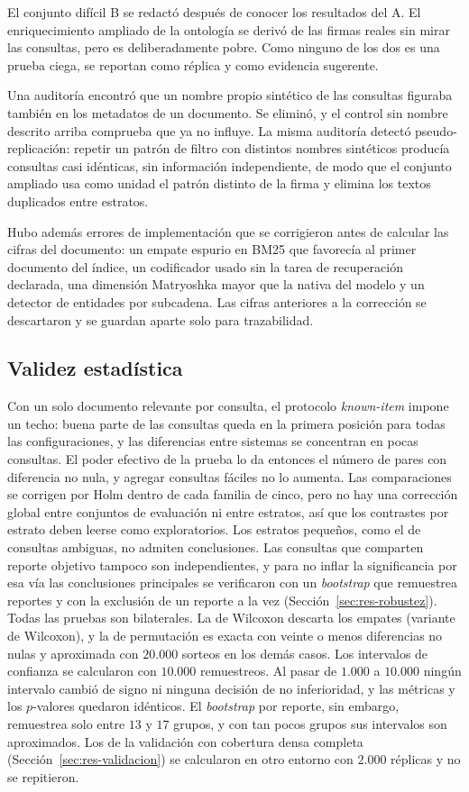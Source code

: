 \documentclass[11pt,letterpaper]{article}
\numberwithin{equation}{section}
\begin{document}
El conjunto difícil B se redactó después de conocer los resultados del A. El enriquecimiento ampliado de la ontología se derivó de las firmas reales sin mirar las consultas, pero es deliberadamente pobre. Como ninguno de los dos es una prueba ciega, se reportan como réplica y como evidencia sugerente.

Una auditoría encontró que un nombre propio sintético de las consultas figuraba también en los metadatos de un documento. Se eliminó, y el control sin nombre descrito arriba comprueba que ya no influye. La misma auditoría detectó pseudo-replicación: repetir un patrón de filtro con distintos nombres sintéticos producía consultas casi idénticas, sin información independiente, de modo que el conjunto ampliado usa como unidad el patrón distinto de la firma y elimina los textos duplicados entre estratos.

Hubo además errores de implementación que se corrigieron antes de calcular las cifras del documento: un empate espurio en BM25 que favorecía al primer documento del índice, un codificador usado sin la tarea de recuperación declarada, una dimensión Matryoshka mayor que la nativa del modelo y un detector de entidades por subcadena. Las cifras anteriores a la corrección se descartaron y se guardan aparte solo para trazabilidad.

\subsection{Validez estadística}
Con un solo documento relevante por consulta, el protocolo \textit{known-item} impone un techo: buena parte de las consultas queda en la primera posición para todas las configuraciones, y las diferencias entre sistemas se concentran en pocas consultas. El poder efectivo de la prueba lo da entonces el número de pares con diferencia no nula, y agregar consultas fáciles no lo aumenta. Las comparaciones se corrigen por Holm dentro de cada familia de cinco, pero no hay una corrección global entre conjuntos de evaluación ni entre estratos, así que los contrastes por estrato deben leerse como exploratorios. Los estratos pequeños, como el de consultas ambiguas, no admiten conclusiones. Las consultas que comparten reporte objetivo tampoco son independientes, y para no inflar la significancia por esa vía las conclusiones principales se verificaron con un \textit{bootstrap} que remuestrea reportes y con la exclusión de un reporte a la vez (Sección~\ref{sec:res-robustez}). Todas las pruebas son bilaterales. La de Wilcoxon descarta los empates (variante de Wilcoxon), y la de permutación es exacta con veinte o menos diferencias no nulas y aproximada con $20.000$ sorteos en los demás casos. Los intervalos de confianza se calcularon con $10.000$ remuestreos. Al pasar de $1.000$ a $10.000$ ningún intervalo cambió de signo ni ninguna decisión de no inferioridad, y las métricas y los $p$-valores quedaron idénticos. El \textit{bootstrap} por reporte, sin embargo, remuestrea solo entre $13$ y $17$ grupos, y con tan pocos grupos sus intervalos son aproximados. Los de la validación con cobertura densa completa (Sección~\ref{sec:res-validacion}) se calcularon en otro entorno con $2.000$ réplicas y no se repitieron.
\end{document}
